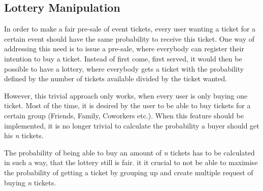 \subsection{Lottery Manipulation}\label{subsection:lottery-manipulation}
In order to make a fair pre-sale of event tickets, every user wanting a ticket for a certain event should have the same probability to receive this ticket. One way of addressing this need is to issue a pre-sale, where everybody can register their intention to buy a ticket. Instead of first come, first served, it would then be possible to have a lottery, where everybody gets a ticket with the probability defined by the number of tickets available divided by the ticket wanted.

However, this trivial approach only works, when every user is only buying one ticket. Most of the time, it is desired by the user to be able to buy tickets for a certain group (Friends, Family, Coworkers etc.). When this feature should be implemented, it is no longer trivial to calculate the probability a buyer should get his \textit{n} tickets. 

The probability of being able to buy an amount of \textit{n} tickets has to be calculated in such a way, that the lottery still is fair. it it crucial to not be able to maximise the probability of getting a ticket by grouping up and create multiple request of buying \textit{n} tickets.

